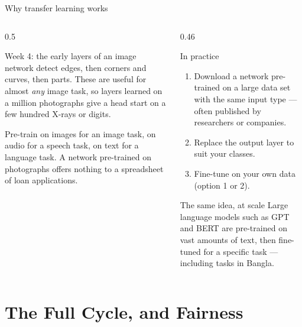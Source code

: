 \documentclass[aspectratio=169,10pt]{beamer}
\begin{document}
\begin{frame}{Why transfer learning works}
  \begin{columns}[T,onlytextwidth]
    \begin{column}{0.5\textwidth}
      \begin{keyidea}
        Week 4: the early layers of an image network detect edges, then corners and curves,
        then parts. These are useful for almost \emph{any} image task, so layers learned on
        a million photographs give a head start on a few hundred X-rays or digits.
      \end{keyidea}
      \begin{pitfall}
        \footnotesize Pre-train on images for an image task, on audio for a speech task, on
        text for a language task. A network pre-trained on photographs offers nothing to a
        spreadsheet of loan applications.
      \end{pitfall}
    \end{column}
    \begin{column}{0.46\textwidth}
      \footnotesize
      \begin{block}{In practice}
        \begin{enumerate}
          \item Download a network pre-trained on a large data set with the same input type
                --- often published by researchers or companies.
          \item Replace the output layer to suit your classes.
          \item Fine-tune on your own data (option 1 or 2).
        \end{enumerate}
      \end{block}
      \begin{block}{The same idea, at scale}
        Large language models such as GPT and BERT are pre-trained on vast amounts of text,
        then fine-tuned for a specific task --- including tasks in Bangla.
      \end{block}
    \end{column}
  \end{columns}
\end{frame}

\section{The Full Cycle, and Fairness}
\end{document}
